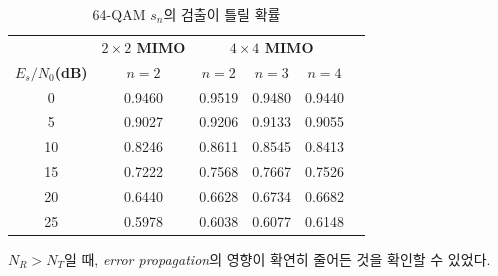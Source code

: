 \documentclass{article}
\begin{document}
\begin{table}[H]
\centering
\begin{tabular}{cccccc}
\toprule
\multicolumn{1}{c}{} & \multicolumn{1}{c}{\textbf{$2\times2$ MIMO}} & \multicolumn{3}{c}{\textbf{$4\times4$ MIMO}} \\
\cmidrule(rl){2-2} \cmidrule(rl){3-5}
\textbf{$E_s/N_0$(dB)} & {$n=2$} & {$n=2$} & {$n=3$} & {$n=4$}\\
\midrule
0 & 0.9460 & 0.9519  &  0.9480   & 0.9440\\
5 & 0.9027 &0.9206   & 0.9133 &   0.9055\\
10 & 0.8246 &  0.8611  &  0.8545  &  0.8413\\
15 & 0.7222 & 0.7568   & 0.7667  &  0.7526\\
20 & 0.6440 & 0.6628   & 0.6734 &   0.6682\\
25 & 0.5978  & 0.6038  &  0.6077  &  0.6148\\
\bottomrule
\end{tabular}
\caption{64-QAM $s_n$의 검출이 틀릴 확률}
\end{table}

\noindent
$N_R > N_T$일 때, \textsl{error propagation}의 영향이 확연히 줄어든 것을 확인할 수 있었다.
\end{document}
